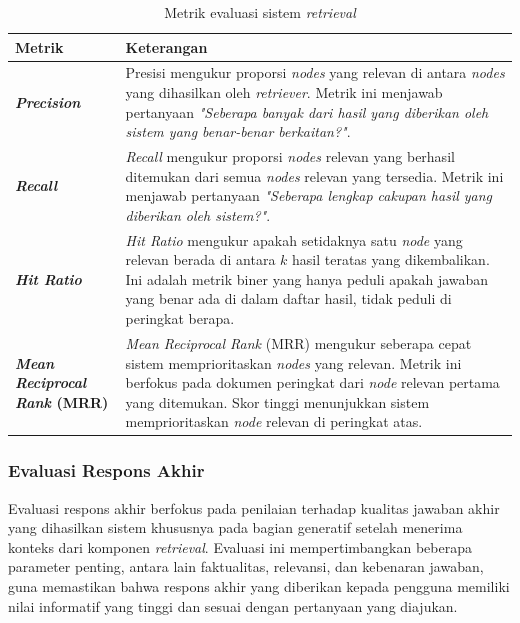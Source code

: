 \begin{table}[H]
	\centering
	\caption{Metrik evaluasi sistem \textit{retrieval} }
	\label{tab:retrieval-evaluation-metrics}
	\begin{tabular}{|p{}|p{}|}
		\hline
		\textbf{Metrik}                              & \textbf{Keterangan}                                                                                                                                                                                                                                    \\
		\hline
		\textbf{\textit{Precision}}                  &
		Presisi mengukur proporsi \textit{nodes} yang relevan di antara \textit{nodes} yang dihasilkan oleh \textit{retriever}. Metrik ini menjawab pertanyaan \textit{"Seberapa banyak dari hasil yang diberikan oleh sistem yang benar-benar berkaitan?"}.                                                  \\
		\hline
		\textbf{\textit{Recall}}                     &
		\textit{Recall} mengukur proporsi \textit{nodes} relevan yang berhasil ditemukan dari semua \textit{nodes} relevan yang tersedia. Metrik ini menjawab pertanyaan \textit{"Seberapa lengkap cakupan hasil yang diberikan oleh sistem?"}.                                                               \\
		\hline
		\textbf{\textit{Hit Ratio}}                  &
		\textit{Hit Ratio} mengukur apakah setidaknya satu \textit{node} yang relevan berada di antara $k$ hasil teratas yang dikembalikan. Ini adalah metrik biner yang hanya peduli apakah jawaban yang benar ada di dalam daftar hasil, tidak peduli di peringkat berapa.                                  \\
		\hline
		\textbf{\textit{Mean Reciprocal Rank} (MRR)} &
		\textit{Mean Reciprocal Rank} (MRR) mengukur seberapa cepat sistem memprioritaskan \textit{nodes} yang relevan. Metrik ini berfokus pada dokumen peringkat dari \textit{node} relevan pertama yang ditemukan. Skor tinggi menunjukkan sistem memprioritaskan \textit{node} relevan di peringkat atas. \\
		\hline
	\end{tabular}
\end{table}

\subsubsection{Evaluasi Respons Akhir}
Evaluasi respons akhir berfokus pada penilaian terhadap kualitas jawaban akhir yang dihasilkan sistem khususnya pada bagian generatif setelah menerima konteks dari komponen \textit{retrieval}.
Evaluasi ini mempertimbangkan beberapa parameter penting, antara lain faktualitas, relevansi, dan kebenaran jawaban, guna memastikan bahwa respons akhir yang diberikan kepada pengguna memiliki nilai informatif yang tinggi dan sesuai dengan pertanyaan yang diajukan.

